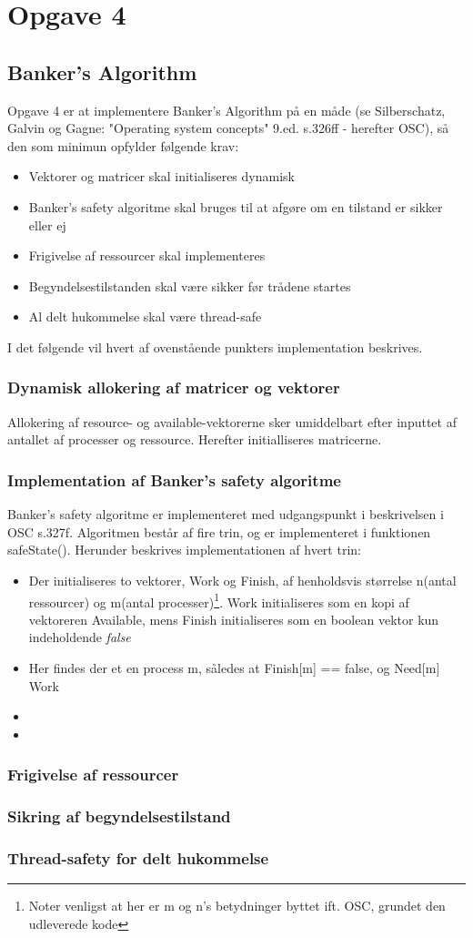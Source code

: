 \section{Opgave 4}
\subsection{Banker's Algorithm}
Opgave 4 er at implementere Banker's Algorithm på en måde (se Silberschatz, Galvin og Gagne: "Operating system concepts" 9.ed. s.326ff - herefter OSC), så den som minimun opfylder følgende krav:
\begin{itemize}
	\item Vektorer og matricer skal initialiseres dynamisk
	\item Banker's safety algoritme skal bruges til at afgøre om en tilstand er sikker eller ej
	\item Frigivelse af ressourcer skal implementeres
	\item Begyndelsestilstanden skal være sikker før trådene startes
	\item Al delt hukommelse skal være thread-safe
\end{itemize}
I det følgende vil hvert af ovenstående punkters implementation beskrives.

\subsubsection*{Dynamisk allokering af matricer og vektorer}
Allokering af resource- og available-vektorerne sker umiddelbart efter inputtet af antallet af processer og ressource. Herefter initialliseres matricerne.

\subsubsection*{Implementation af Banker's safety algoritme}
Banker's safety algoritme er implementeret med udgangspunkt i beskrivelsen i OSC s.327f. Algoritmen består af fire trin, og er implementeret i funktionen safeState(). Herunder beskrives implementationen af hvert trin:
\begin{itemize}
	\item Der initialiseres to vektorer, Work og Finish, af henholdsvis størrelse n(antal ressourcer) og m(antal processer)\footnote{Noter venligst at her er m og n's betydninger byttet ift. OSC, grundet den udleverede kode}. Work initialiseres som en kopi af vektoreren Available, mens Finish initialiseres som en boolean vektor kun indeholdende \textit{false}
	\item Her findes der et en process m, således at Finish[m] == false, og Need[m]  Work
	\item
	\item
\end{itemize}

\subsubsection*{Frigivelse af ressourcer}
\subsubsection*{Sikring af begyndelsestilstand}
\subsubsection*{Thread-safety for delt hukommelse}




